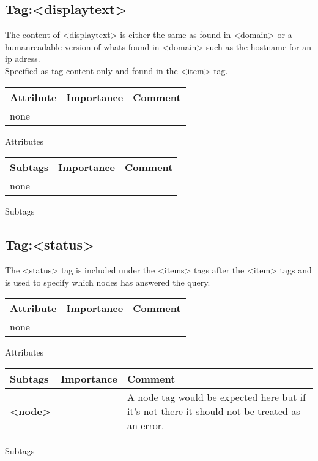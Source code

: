 \documentclass[a4paper]{article}
\newcommand{\xmlv}[1]{\textbf{\textless#1\textgreater}}
\newcommand{\xml}[1]{\textless#1\textgreater}
\begin{document}
    \subsection{Tag:\xml{displaytext}  }
        The content of \xml{displaytext} is either the same as found in 
        \xml{domain} or a humanreadable version of whats found in \xml{domain} 
        such as the hostname for an ip adress.\\ 
        Specified as tag content only and found in the \xml{item} tag.

    \begin{center}
        \begin{tabular}{ | p{2.1cm} | p{2cm} | p{9cm} |}
        \hline
        \textbf{Attribute} & \textbf{Importance} & \textbf{Comment}  
        \\ \hline
        none & &
        \\ \hline
        \end{tabular}
        
        \small Attributes
        
        \begin{tabular}{ | p{2.1cm} | p{2cm} | p{9cm} |}
        \hline
        \textbf{Subtags} & \textbf{Importance} & \textbf{Comment}  
        \\ \hline
        none
        &
        &
        \\ \hline
        \end{tabular}
        
        \small Subtags
    \end{center} 

    \subsection{Tag:\xml{status}  }
        The \xml{status} tag is included under the \xml{items} tags after the 
        \xml{item} tags and is used to specify which nodes has answered the query.

    \begin{center}
        \begin{tabular}{ | p{2.1cm} | p{2cm} | p{9cm} |}
        \hline
        \textbf{Attribute} & \textbf{Importance} & \textbf{Comment}  
        \\ \hline
        none & &
        \\ \hline
        \end{tabular}
        
        \small Attributes
        
        \begin{tabular}{ | p{2.1cm} | p{2cm} | p{9cm} |}
        \hline
        \textbf{Subtags} & \textbf{Importance} & \textbf{Comment}  
        \\ \hline
        \xmlv{node}
        &
        & A node tag would be expected here but if it's not there it should not be treated as an error.
        \\ \hline
        \end{tabular}
        
        \small Subtags
    \end{center}        
\end{document}
